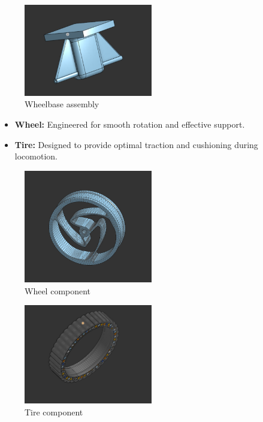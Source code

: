 \documentclass[12pt,a4paper]{report}
\begin{document}
\begin{figure}[H]
\centering
\includegraphics[width=0.5\textwidth]{media/Wheelbase.png}
\caption{Wheelbase assembly}
\end{figure}

\begin{itemize}
    \item \textbf{Wheel:} Engineered for smooth rotation and effective support.
\end{itemize}
\begin{itemize}
    \item \textbf{Tire:} Designed to provide optimal traction and cushioning during locomotion.
\end{itemize}

\begin{figure}[H]
\centering
\includegraphics[width=0.5\textwidth]{media/Wheel.png}
\caption{Wheel component}
\end{figure}
\begin{figure}[H]
\centering
\includegraphics[width=0.5\textwidth]{media/Tire.png}
\caption{Tire component}
\end{figure}
\end{document}
